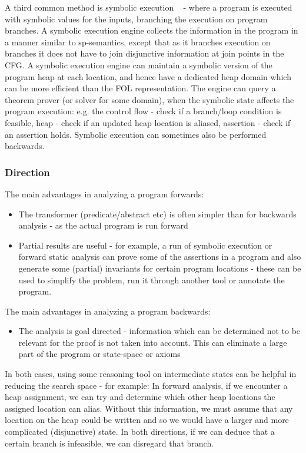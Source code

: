 A third common method is symbolic execution ~\cite{Boyer:1975:SFS:390016.808445} - where a program is executed with symbolic values for the inputs, branching the execution on program branches.
A symbolic execution engine collects the information in the program in a manner similar to sp-semantics, except that as it branches execution on branches it does not have to join disjunctive information at join points in the CFG.
A symbolic execution engine can maintain a symbolic version of the program heap at each location, and hence have a dedicated heap domain which can be more efficient than the FOL representation.
The engine can query a theorem prover (or solver for some domain), when the symbolic state affects the program execution: e.g. the  control flow - check if a branch/loop condition is feasible, heap - check if an updated heap location is aliased, assertion - check if an assertion holds.
Symbolic execution can sometimes also be performed backwards.


\subsubsection*{Direction}
The main advantages in analyzing a program forwards:
\begin{itemize}
	\item The transformer (predicate/abstract etc) is often simpler than for backwards analysis - as the actual program is run forward
	\item Partial results are useful - for example, a run of symbolic execution or forward static analysis can prove some of the assertions in a program and also generate some (partial) invariants for certain program locations - these can be used to simplify the problem, run it through another tool or annotate the program.
\end{itemize}

The main advantages in analyzing a program backwards:
\begin{itemize}
	\item The analysis is goal directed - information which can be determined not to be relevant for the proof is not taken into account.
	This can eliminate a large part of the program or state-space or axioms
\end{itemize}


In both cases, using some reasoning tool on intermediate states can be helpful in reducing the search space - for example:
In forward analysis, if we encounter a heap assignment, we can try and determine which other heap locations the assigned location can alias. Without this information, we must assume that any location on the heap could be written and so we would have a larger and more complicated (disjunctive) state.
In both directions, if we can deduce that a certain branch is infeasible, we can disregard that branch.

